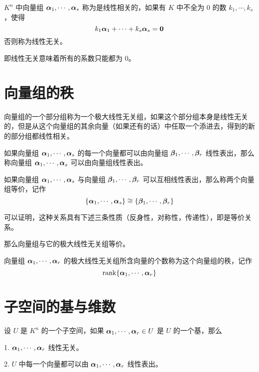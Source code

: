 \begin{definition}
	$K^n$ 中向量组 $\boldsymbol{\alpha}_1,\cdots,\boldsymbol{\alpha}_s$ 称为是线性相关的，如果有 $K$ 中不全为 $0$ 的数 $k_1,\cdots,k_s$，使得
	$$k_1\boldsymbol{\alpha}_1+\cdots+k_s\boldsymbol{\alpha}_s=\boldsymbol{0}$$
	否则称为线性无关。
\end{definition}

即线性无关意味着所有的系数只能都为 $0$。

\section{向量组的秩}

\begin{definition}[极大线性无关组]
	向量组的一个部分组称为一个极大线性无关组，如果这个部分组本身是线性无关的，但是从这个向量组的其余向量（如果还有的话）中任取一个添进去，得到的新的部分组都线性相关。
\end{definition}

如果向量组 $\boldsymbol{\alpha}_1,\cdots,\boldsymbol{\alpha}_s$ 的每一个向量都可以由向量组 $\boldsymbol{\beta}_1,\cdots,\boldsymbol{\beta}_r$ 线性表出，那么称向量组 $\boldsymbol{\alpha}_1,\cdots,\boldsymbol{\alpha}_s$ 可以由向量组线性表出。

\begin{definition}
	如果向量组 $\boldsymbol{\alpha}_1,\cdots,\boldsymbol{\alpha}_s$ 与向量组 $\boldsymbol{\beta}_1,\cdots,\boldsymbol{\beta}_r$ 可以互相线性表出，那么称两个向量组等价，记作
	$$\{\boldsymbol{\alpha}_1,\cdots,\boldsymbol{\alpha}_s\} \cong \{\boldsymbol{\beta}_1,\cdots,\boldsymbol{\beta}_r\}$$
\end{definition}

可以证明，这种关系具有下述三条性质（反身性，对称性，传递性），即是等价关系。

那么向量组与它的极大线性无关组等价。

\begin{definition}
	向量组 $\boldsymbol{\alpha}_1,\cdots,\boldsymbol{\alpha}_r$ 的极大线性无关组所含向量的个数称为这个向量组的秩，记作
	$$\mathrm{rank}\{\boldsymbol{\alpha}_1,\cdots,\boldsymbol{\alpha}_r\}$$
\end{definition}

\section{子空间的基与维数}

\begin{definition}
	设 $U$ 是 $K^n$ 的一个子空间，如果 $\boldsymbol{\alpha}_1,\cdots,\boldsymbol{\alpha}_r\in U$ 是 $U$ 的一个基，那么

	1. $\boldsymbol{\alpha}_1,\cdots,\boldsymbol{\alpha}_r$ 线性无关。

	2. $U$ 中每一个向量都可以由 $\boldsymbol{\alpha}_1,\cdots,\boldsymbol{\alpha}_r$ 线性表出。
\end{definition}

